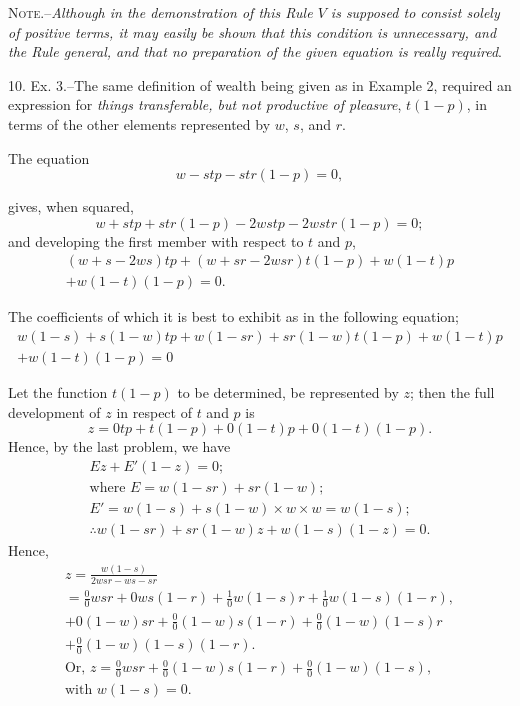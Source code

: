 \documentclass[oneside]{book}
\begin{document}
\textsc{Note}.--\textit{Although in the demonstration of this Rule $V$ is
supposed to consist solely of positive terms, it may easily be shown that
this condition is unnecessary, and the Rule general, and that no
preparation of the given equation is really required}.

10. Ex. 3.--The same definition of wealth being given as in
Example 2, required an expression for \textit{things transferable, but not
productive of pleasure}, $t(1 - p)$, in terms of the other elements
represented by $w$, $s$, and $r$.

The equation
\[
w - stp - str (1 - p) = 0,
\]

gives, when squared,
\[
w + stp + str (1 - p) - 2wstp - 2wstr (1 - p) = 0;
\]
and developing the first member with respect to $t$ and $p$,
\begin{eqnarray*}
(w + s - 2ws) tp + (w + sr - 2wsr) t (1 - p) + w (1 -t)p\\
+ w(1-t)(1-p) = 0.
\end{eqnarray*}

The coefficients of which it is best to exhibit as in the following
equation;
\begin{eqnarray*}
{w(1-s)+s(1-w)}tp+{w(1-sr)+sr(1-w)}t(1-p)+w(1-t)p\\
+w(1-t)(1-p)=0
\end{eqnarray*}

Let the function $t (1 -p)$ to be determined, be represented by $z$;
then the full development of $z$ in respect of $t$ and $p$ is
\[
z = 0 tp + t (1 - p) + 0(1 - t) p + 0(1 - t) (1 - p).
\]
Hence, by the last problem, we have
\begin{eqnarray*}
Ez + E'(1-z)=0;\\
\textrm{where }E = w (1 - sr) + sr (1 - w);\\
E'= {w(1 - s) + s (1 - w) } \times w \times w = w(1 - s) ; \\
\therefore {w(1 - sr) + sr(1 - w)} z + w(1 - s) (1 - z) =0.
\end{eqnarray*}
Hence,
\begin{eqnarray*}
z=\frac{w(1-s)}{2wsr-ws-sr}\\
= \frac{0}{0}wsr + 0ws(1 - r) + \frac{1}{0}w(1 - s)r + \frac{1}{0}w(1 - s)(1 - r),\\
+ 0(1 - w)sr + \frac{0}{0}(1 - w)s(1 - r) + \frac{0}{0}(1 - w)(1 - s)r\\
+ \frac{0}{0}(1 - w)(1 - s)(1 - r). \\
\textrm{Or, } z = \frac{0}{0} wsr + \frac{0}{0}(1-w)s(1-r) + \frac{0}{0} (1- w)(1 - s),\\
\textrm{with }w (1 - s) = 0.
\end{eqnarray*}
\end{document}
